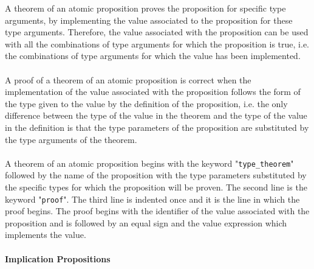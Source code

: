 \documentclass[diploma]{softlab-thesis}
\begin{document}
\begin{itemize}
A theorem of an atomic proposition proves the proposition for
specific type arguments, by implementing the value associated to the
proposition for these type arguments. Therefore, the value associated with the
proposition can be used with all the combinations of type arguments for which
the proposition is true, i.e. the combinations of type arguments for which
the value has been implemented.
\\\\
A proof of a theorem of an atomic proposition is correct when the
implementation of the value associated with the proposition follows the form of
the type given to the value by the definition of the proposition, i.e. the only
difference between the type of the value in the theorem and the type of the
value in the definition is that the type parameters of the proposition are
substituted by the type arguments of the theorem.
\\\\
A theorem of an atomic proposition begins with the keyword
"\verb|type_theorem|" followed by the name of the proposition with the type
parameters substituted by the specific types for which the proposition will be
proven. The second line is the keyword "\verb|proof|". The third line is
indented once and it is the line in which the proof begins. The proof begins
with the identifier of the value associated with the proposition and is
followed by an equal sign and the value expression which implements the value.

\end{itemize}

\newpage

\paragraph{Implication Propositions}
\end{document}

